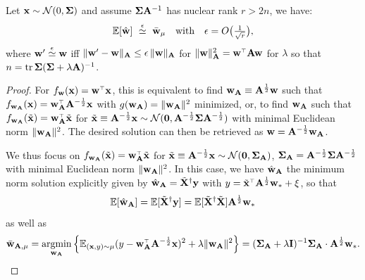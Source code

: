\documentclass[11pt]{article}
\begin{document}
\begin{theorem}\label{t:main-Mahalanobis}
Let $\mathbf x\sim\mathcal{N}(0,\mathbf{\Sigma})$ and assume $\mathbf{\Sigma} \mathbf A^{-1}$ has nuclear rank
  $r>2n$, we have:
  \begin{align*}
    \mathbb E [\hat {\mathbf w}]
   \ \overset{\epsilon}{\simeq}\ \bar {\mathbf w}_\mu
\quad    \text{with}\quad\epsilon = O\big(\tfrac1{\sqrt r}\big),
  \end{align*}
  where $\mathbf w'\overset\epsilon\simeq\mathbf w$ iff
  $\|\mathbf w'-\mathbf w\|_\mathbf A \leq \epsilon\,\|\mathbf w\|_\mathbf A$ for $\| \w \|_\A^2 = \w^\top \A \w $ for $\lambda$ so that $n=\mathrm{tr}\,\mathbf{\Sigma}(\mathbf{\Sigma}+\lambda\mathbf A)^{-1}$.
\end{theorem}
\begin{proof}
For $f_\w(\x) = \w^\top \x$, this is equivalent to find $\mathbf w_\mathbf A \equiv \mathbf A^{\frac12} \mathbf w$ such that $f_{\w_\A} (\x) = \w_\A^\top \A^{-\frac12} \x$ with $g(\mathbf w_\mathbf A) = \| \mathbf w_\mathbf A \|^2$ minimized, or, to find $\mathbf w_\mathbf A$ such that $f_{\w_\A} (\tilde \x) = \w_\A^\top \tilde \x$ for $\tilde {\mathbf x} \equiv \mathbf A^{-\frac12} \mathbf x \sim \mathcal{N} (\mathbf 0, \mathbf A^{-\frac12} \mathbf{\Sigma} \mathbf A^{-\frac12} )$ with minimal Euclidean norm $\| \mathbf w_\mathbf A \|^2$. The desired solution can then be retrieved as $\mathbf w = \mathbf A^{-\frac12} \mathbf w_\mathbf A$.

We thus focus on $f_{\w_\A} (\tilde \x) = \w_\A^\top \tilde \x$ for $\tilde {\mathbf x} \equiv \mathbf A^{-\frac12} \mathbf x \sim \mathcal{N} (\mathbf 0, \mathbf{\Sigma}_\mathbf A )$, $\mathbf{\Sigma}_\mathbf A = \mathbf A^{-\frac12} \mathbf{\Sigma} \mathbf A^{-\frac12}$ with minimal Euclidean norm $\| \mathbf w_\mathbf A \|^2$. In this case, we have $\hat {\mathbf w}_\mathbf A$ the minimum norm solution explicitly given by $\hat {\mathbf w}_\mathbf A = \tilde {\mathbf X}^\dagger \mathbf y$ with $y = \tilde \x^\top \A^{\frac12} \w_* + \xi$, so that
\[
  \mathbb E [\hat {\mathbf w}_\mathbf A]= \mathbb E[\tilde {\mathbf X}^\dagger \mathbf y] = \mathbb E[\tilde {\mathbf X}^\dagger \tilde {\mathbf X}] \mathbf A^{\frac12} \mathbf w_*
\]
as well as
\[
  \bar{\w}_{\A,\mu} = \argmin_{\w_\A} \left\{ \E_{(\x,y) \sim \mu} (y - \w_\A^\top \A^{-\frac12} \x)^2 + \lambda \| \w_\A \|^2 \right\} = (\Sigmab_\A + \lambda \I)^{-1} \Sigmab_\A \cdot \A^{\frac12} \w_*.
\]


\end{proof}
\end{document}
